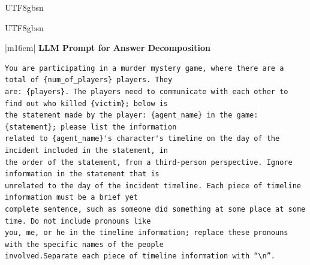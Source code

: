 \documentclass[11pt]{article}
\begin{document}
{\begin{CJK}{UTF8}{gbsn}
\begin{table}[ht!]
\caption{LLM prompt and output for murderer identification. ( English Translation)}
\end{table}
\end{CJK}

\begin{CJK}{UTF8}{gbsn}
\begin{table}[ht!]
\centering
\begin{minipage}[t]{\linewidth}
\begin{tabular}{|m{16cm}|}
\hline
{}  {\textbf{LLM Prompt for Answer Decomposition}} \\
\begin{minipage}[t]{\linewidth}
\small\begin{verbatim}
You are participating in a murder mystery game, where there are a total of {num_of_players} players. They
are: {players}. The players need to communicate with each other to find out who killed {victim}; below is
the statement made by the player: {agent_name} in the game: {statement}; please list the information 
related to {agent_name}'s character's timeline on the day of the incident included in the statement, in 
the order of the statement, from a third-person perspective. Ignore information in the statement that is
unrelated to the day of the incident timeline. Each piece of timeline information must be a brief yet 
complete sentence, such as someone did something at some place at some time. Do not include pronouns like
you, me, or he in the timeline information; replace these pronouns with the specific names of the people
involved.Separate each piece of timeline information with “\n”.


\end{verbatim}
\end{minipage}
\end{tabular}
\end{minipage}
\end{table}
\end{CJK}}
\end{document}
